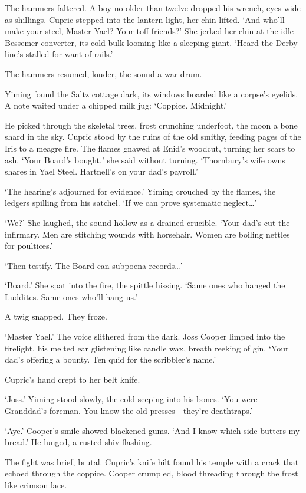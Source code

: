The hammers faltered. A boy no older than twelve dropped his wrench, eyes wide as shillings. Cupric stepped into the lantern light, her chin lifted. `And who'll make your steel, Master Yael? Your toff friends?' She jerked her chin at the idle Bessemer converter, its cold bulk looming like a sleeping giant. `Heard the Derby line's stalled for want of rails.'

The hammers resumed, louder, the sound a war drum.

Yiming found the Saltz cottage dark, its windows boarded like a corpse's eyelids. A note waited under a chipped milk jug: `Coppice. Midnight.'

He picked through the skeletal trees, frost crunching underfoot, the moon a bone shard in the sky. Cupric stood by the ruins of the old smithy, feeding pages of the Iris to a meagre fire. The flames gnawed at Enid's woodcut, turning her scars to ash. `Your Board's bought,' she said without turning. `Thornbury's wife owns shares in Yael Steel. Hartnell's on your dad's payroll.'

`The hearing's adjourned for evidence.' Yiming crouched by the flames, the ledgers spilling from his satchel. `If we can prove systematic neglect\dots'

`We?' She laughed, the sound hollow as a drained crucible. `Your dad's cut the infirmary. Men are stitching wounds with horsehair. Women are boiling nettles for poultices.'

`Then testify. The Board can subpoena records\dots'

`Board.' She spat into the fire, the spittle hissing. `Same ones who hanged the Luddites. Same ones who'll hang us.'

A twig snapped. They froze.

`Master Yael.' The voice slithered from the dark. Joss Cooper limped into the firelight, his melted ear glistening like candle wax, breath reeking of gin. `Your dad's offering a bounty. Ten quid for the scribbler's name.'

Cupric's hand crept to her belt knife.

`Joss.' Yiming stood slowly, the cold seeping into his bones. `You were Granddad's foreman. You know the old presses - they're deathtraps.'

`Aye.' Cooper's smile showed blackened gums. `And I know which side butters my bread.' He lunged, a rusted shiv flashing.

The fight was brief, brutal. Cupric's knife hilt found his temple with a crack that echoed through the coppice. Cooper crumpled, blood threading through the frost like crimson lace.

